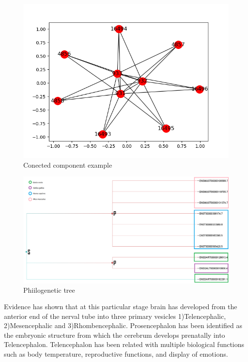 \documentclass[a4paper]{article}
\begin{document}
\begin{figure}[h]
			\centering
            \includegraphics[height = 0.40\textheight]{Figure_1.png}
            \caption{Conected component example}\label{cc}
		\end{figure}

\begin{figure}[h]
			\centering
            \includegraphics[height = 0.20\textheight]{Arbolbuenoahorasi.png}
            \caption{Phiilogenetic tree}\label{Philogenetic tree}
            
		\end{figure}

Evidence has shown that at this particular stage brain has developed from the anterior end of the nerval tube into three primary vesicles 1)Telencephalic, 2)Mesencephalic and 3)Rhombencephalic. Prosencephalon has been identified as the embryonic structure from which the cerebrum develops prenatally into Telencephalon. Telencephalon has been related with multiple biological functions such as body temperature, reproductive functions, and display of emotions.
 
\end{document}

